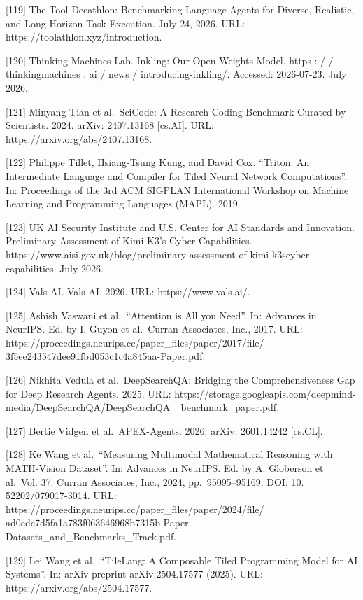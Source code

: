 \documentclass[
  10
]{article}
\begin{document}
{[}119{]} The Tool Decathlon: Benchmarking Language Agents for Diverse,
Realistic, and Long-Horizon Task Execution. July 24, 2026. URL:
https://toolathlon.xyz/introduction.

{[}120{]} Thinking Machines Lab. Inkling: Our Open-Weights Model. https
: / / thinkingmachines . ai / news / introducing-inkling/. Accessed:
2026-07-23. July 2026.

{[}121{]} Minyang Tian et al.~SciCode: A Research Coding Benchmark
Curated by Scientists. 2024. arXiv: 2407.13168 {[}cs.AI{]}. URL:
https://arxiv.org/abs/2407.13168.

{[}122{]} Philippe Tillet, Hsiang-Tsung Kung, and David Cox. ``Triton:
An Intermediate Language and Compiler for Tiled Neural Network
Computations''. In: Proceedings of the 3rd ACM SIGPLAN International
Workshop on Machine Learning and Programming Languages (MAPL). 2019.

{[}123{]} UK AI Security Institute and U.S. Center for AI Standards and
Innovation. Preliminary Assessment of Kimi K3's Cyber Capabilities.
https://www.aisi.gov.uk/blog/preliminary-assessment-of-kimi-k3scyber-capabilities.
July 2026.

{[}124{]} Vals AI. Vals AI. 2026. URL: https://www.vals.ai/.

{[}125{]} Ashish Vaswani et al.~``Attention is All you Need''. In:
Advances in NeurIPS. Ed. by I. Guyon et al.~Curran Associates, Inc.,
2017. URL: https://proceedings.neurips.cc/paper\_files/paper/2017/file/
3f5ee243547dee91fbd053c1c4a845aa-Paper.pdf.

{[}126{]} Nikhita Vedula et al.~DeepSearchQA: Bridging the
Comprehensiveness Gap for Deep Research Agents. 2025. URL:
https://storage.googleapis.com/deepmind-
media/DeepSearchQA/DeepSearchQA\_ benchmark\_paper.pdf.

{[}127{]} Bertie Vidgen et al.~APEX-Agents. 2026. arXiv: 2601.14242
{[}cs.CL{]}.

{[}128{]} Ke Wang et al.~``Measuring Multimodal Mathematical Reasoning
with MATH-Vision Dataset''. In: Advances in NeurIPS. Ed. by A. Globerson
et al.~Vol. 37. Curran Associates, Inc., 2024, pp.~95095--95169. DOI:
10. 52202/079017-3014. URL:
https://proceedings.neurips.cc/paper\_files/paper/2024/file/
ad0edc7d5fa1a783f063646968b7315b-Paper-Datasets\_and\_Benchmarks\_Track.pdf.

{[}129{]} Lei Wang et al.~``TileLang: A Composable Tiled Programming
Model for AI Systems''. In: arXiv preprint arXiv:2504.17577 (2025). URL:
https://arxiv.org/abs/2504.17577.
\end{document}
